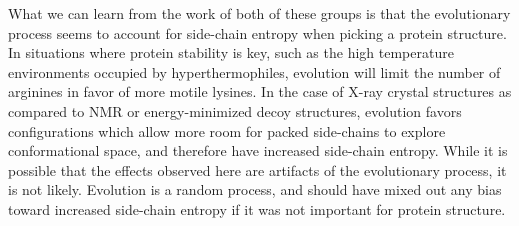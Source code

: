 What we can learn from the work of both of these groups is that the evolutionary process seems to account for side-chain entropy when picking a protein structure. In situations where protein stability is key, such as the high temperature environments occupied by hyperthermophiles, evolution will limit the number of arginines in favor of more motile lysines. In the case of X-ray crystal structures as compared to NMR or energy-minimized decoy structures, evolution favors configurations which allow more room for packed side-chains to explore conformational space, and therefore have increased side-chain entropy. While it is possible that the effects observed here are artifacts of the evolutionary process, it is not likely. Evolution is a random process, and should have mixed out any bias toward increased side-chain entropy if it was not important for protein structure.